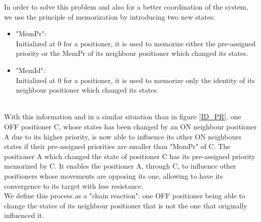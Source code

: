 \documentclass[]{spie}  %
\begin{document}
	In order to solve this problem and also for a better coordination of the system, we use the principle of memorization by introducing two new states: 
	\begin{itemize}
		\item "MemPr":  \\
		Initialized at 0 for a positioner, it is used to memorize either the pre-assigned priority or the MemPr of its neighbour positioner which changed its  states.\\
		\item "MemId": \\
		Initialized at 0 for a positioner, it is used to memorize only the identity of its neighbour positioner which changed its states.
	\end{itemize}\\
	  With this information and in a similar situation than in figure \ref{ID_PR}, one OFF positioner C, whose states has been changed by an ON neighbour positioner A due to its higher priority, is now able to influence its other ON neighbours states if their pre-assigned priorities are smaller than "MemPr" of C. The positioner A which changed the state of positioner C has its pre-assigned priority memorized by C. It enables the positioner A, through C, to influence other positioners whose movements are opposing its one, allowing to have its convergence to its target with less resistance.\\
	 We define this process as a "chain reaction": one OFF positioner being able to change the states of its neighbour positioner that is not the one that originally influenced it. \\
	 
\end{document}
